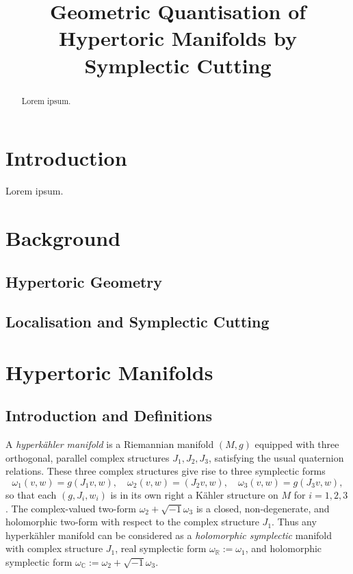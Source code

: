 \documentclass{article}
\title{Geometric Quantisation of Hypertoric Manifolds by Symplectic Cutting}
\date{}	%
\newcommand{\w}{\omega}
\newcommand{\K}{K\"ahler }
\newcommand{\HK}{hyperk\"ahler }
\newcommand{\RR}{\mathbb{R}}
\newcommand{\CC}{\mathbb{C}}
\begin{document}
	\maketitle
	
	\begin{abstract}
		Lorem ipsum.
	\end{abstract}
	
	\section{Introduction}
	
	Lorem ipsum.
	
	\section{Background}
	
	\subsection{Hypertoric Geometry}
	
	\subsection{Localisation and Symplectic Cutting}
	
	
	
	\section{Hypertoric Manifolds}

	\subsection{Introduction and Definitions}
	
	A \emph{\HK manifold} is a Riemannian manifold $(M,g)$ equipped with three orthogonal, parallel complex structures $J_{1}, J_{2}, J_{3}$, satisfying the usual quaternion relations. These three complex structures give rise to three symplectic forms
	$$
	\w_{1}(v,w) = g(J_{1}v,w),\quad \w_{2}(v,w) = (J_{2}v,w),\quad \w_{3}(v,w) = g(J_{3}v,w),
	$$
	so that each $(g,J_{i},w_{i})$ is in its own right a \K structure on $M$ for $i = 1,2,3$. The complex-valued two-form $\w_{2} + \sqrt{-1}\w_{3}$ is a closed, non-degenerate, and holomorphic two-form with respect to the complex structure $J_{1}$. Thus any \HK manifold can be considered as a \emph{holomorphic symplectic} manifold with complex structure $J_{1}$, real symplectic form $\w_{\RR} := \w_{1}$, and holomorphic symplectic form $\w_{\CC} := \w_{2} + \sqrt{-1}\w_{3}$.
	
\end{document}
